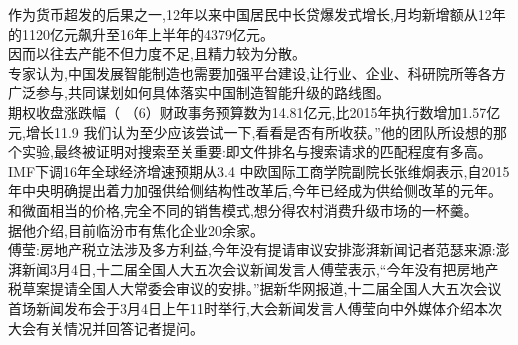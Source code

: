 \documentclass[runningheads,a4paper]{llncs}
\begin{document}
\begin{CJK*}{UTF8}{gbsn}
作为\colorbox{green!30}{货币超发}的后果之一,12年以来\colorbox{green!30}{中国居民中长贷}爆发式增长,\colorbox{green!30}{月均新增额}从12年的1120亿元飙升至16年上半年的4379亿元。\\
因而以往\colorbox{green!30}{去产能}不但力度不足,且精力较为分散。\\
\colorbox{green!30}{专家}认为,\colorbox{green!30}{中国}发展\colorbox{green!30}{智能制造}也需要加强\colorbox{green!30}{平台建设},让\colorbox{green!30}{行业}、\colorbox{green!30}{企业}、\colorbox{green!30}{科研院所}等各方广泛参与,共同谋划如何具体落实\colorbox{green!30}{中国制造}\colorbox{red!30}{智能升级}的\colorbox{red!30}{路线图}。\\
\colorbox{green!30}{期权收盘涨跌幅}（%
（6）\colorbox{green!30}{财政事务预算数}为14.81亿元,比2015年\colorbox{green!30}{执行数}增加1.57亿元,增长11.9%
我们认为至少应该尝试一下,看看是否有所收获。”他的\colorbox{green!30}{团队}所设想的那个实验,最终被证明对搜索至关重要:即文件排名与搜索请求的匹配程度有多高。\\
\colorbox{green!30}{IMF}下调\colorbox{green!30}{16年全球经济增速预期}从3.4%
\colorbox{green!30}{中欧国际工商学院副院长张维烔}表示,自2015年\colorbox{green!30}{中央}明确提出着力加强\colorbox{green!30}{供给侧结构性改革}后,今年已经成为\colorbox{green!30}{供给侧改革}的元年。\\
和\colorbox{green!30}{微面}相当的\colorbox{red!30}{价格},完全不同的\colorbox{green!30}{销售模式},想分得\colorbox{green!30}{农村消费升级市场}的一杯羹。\\
据他介绍,目前\colorbox{green!30}{临汾市}有\colorbox{green!30}{焦化企业}20余家。\\
\colorbox{green!30}{傅莹}:\colorbox{green!30}{房地产税立法}涉及多方利益,今年没有提请审议安排\colorbox{green!30}{澎湃新闻记者范瑟}来源:\colorbox{green!30}{澎湃新闻}3月4日,\colorbox{green!30}{十二届全国人大五次会议新闻发言人傅莹}表示,“今年没有把\colorbox{green!30}{房地产税草案}提请\colorbox{green!30}{全国人大常委会}审议的安排。”据\colorbox{green!30}{新华网}报道,\colorbox{green!30}{十二届全国人大五次会议首场新闻发布会}于3月4日上午11时举行,\colorbox{green!30}{大会新闻发言人傅莹}向\colorbox{green!30}{中外媒体}介绍本次\colorbox{blue!30}{大会}有关情况并回答\colorbox{blue!30}{记者}提问。\\
\end{CJK*}
\end{document}
